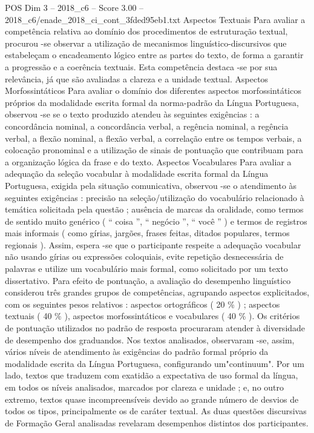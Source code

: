 \begin{textsample}{POS Dim 3 – 2018\_c6 – Score 3.00 – 2018\_c6/enade\_2018\_ci\_cont\_3fded95eb1.txt}
Aspectos Textuais Para avaliar a competência relativa ao domínio dos procedimentos de estruturação textual, procurou -se observar a utilização de mecanismos linguístico-discursivos que estabeleçam o encadeamento lógico entre as partes do texto, de forma a garantir a progressão e a coerência textuais.
Esta competência destaca -se por sua relevância, já que são avaliadas a clareza e a unidade textual.
Aspectos Morfossintáticos Para avaliar o domínio dos diferentes aspectos morfossintáticos próprios da modalidade escrita formal da norma-padrão da Língua Portuguesa, observou -se se o texto produzido atendeu às seguintes exigências : a concordância nominal, a concordância verbal, a regência nominal, a regência verbal, a flexão nominal, a flexão verbal, a correlação entre os tempos verbais, a colocação pronominal e a utilização de sinais de pontuação que contribuam para a organização lógica da frase e do texto.
Aspectos Vocabulares Para avaliar a adequação da seleção vocabular à modalidade escrita formal da Língua Portuguesa, exigida pela situação comunicativa, observou -se o atendimento às seguintes exigências : precisão na seleção/utilização do vocabulário relacionado à temática solicitada pela questão ; ausência de marcas da oralidade, como termos de sentido muito genérico ( “ coisa ”, “ negócio ”, “ você ” ) e termos de registros mais informais ( como gírias, jargões, frases feitas, ditados populares, termos regionais ).
Assim, espera -se que o participante respeite a adequação vocabular não usando gírias ou expressões coloquiais, evite repetição desnecessária de palavras e utilize um vocabulário mais formal, como solicitado por um texto dissertativo.
Para efeito de pontuação, a avaliação do desempenho linguístico considerou três grandes grupos de competências, agrupando aspectos explicitados, com os seguintes pesos relativos : aspectos ortográficos ( 20 \% ) ; aspectos textuais ( 40 \% ), aspectos morfossintáticos e vocabulares ( 40 \% ).
Os critérios de pontuação utilizados no padrão de resposta procuraram atender à diversidade de desempenho dos graduandos.
Nos textos analisados, observaram -se, assim, vários níveis de atendimento às exigências do padrão formal próprio da modalidade escrita da Língua Portuguesa, configurando um"continuum".
Por um lado, textos que traduzem com exatidão a expectativa de uso formal da língua, em todos os níveis analisados, marcados por clareza e unidade ; e, no outro extremo, textos quase incompreensíveis devido ao grande número de desvios de todos os tipos, principalmente os de caráter textual.
As duas questões discursivas de Formação Geral analisadas revelaram desempenhos distintos dos participantes.

\end{textsample}
